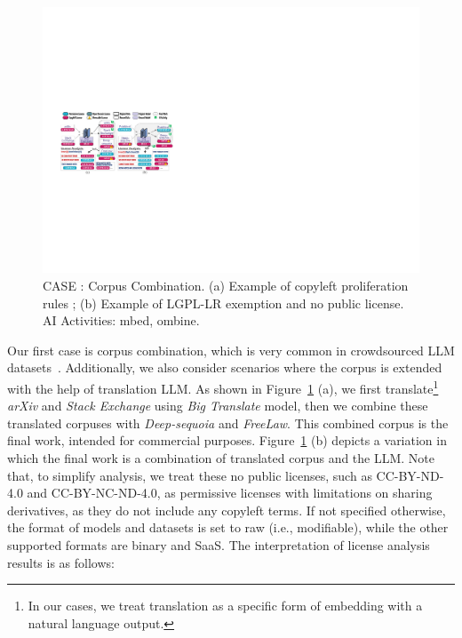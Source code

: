 \begin{figure}[h]
    \centering
    \includegraphics[width=\linewidth]{fig/case1.pdf}
    \caption{CASE : Corpus Combination. (a) Example of copyleft proliferation rules ; (b) Example of LGPL-LR exemption and no public license. AI Activities: mbed, ombine.}
    \Description{}
    \label{fig:case1}
\end{figure}

Our first case is corpus combination, which is very common in crowdsourced LLM datasets~\cite{gao2020the, penedo2023refinedweb, kocetkov2023stack}. 
Additionally, we also consider scenarios where the corpus is extended with the help of translation LLM.
As shown in Figure~\ref{fig:case1} (a), we first translate\footnote{In our cases, we treat translation as a specific form of embedding with a natural language output.} \textit{arXiv} and \textit{Stack Exchange} using \textit{Big Translate} model, then we combine these translated corpuses with \textit{Deep-sequoia} and \textit{FreeLaw}.
This combined corpus is the final work, intended for commercial purposes.
Figure~\ref{fig:case1} (b) depicts a variation in which the final work is a combination of translated corpus and the LLM.
Note that, to simplify analysis, we treat these no public licenses, such as CC-BY-ND-4.0 and CC-BY-NC-ND-4.0, as permissive licenses with limitations on sharing derivatives, as they do not include any copyleft terms.
If not specified otherwise, the format of models and datasets is set to raw (i.e., modifiable), while the other supported formats are binary and SaaS.
The interpretation of license analysis results is as follows:


